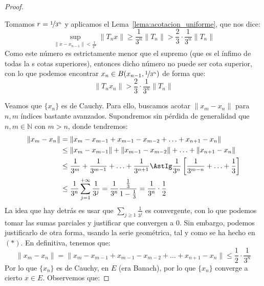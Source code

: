 \begin{teo}
\begin{proof}
\begin{itemize}
                Tomamos $r = \nicefrac{1}{3^n}$ y aplicamos el Lema~\ref{lema:acotacion_uniforme}, que nos dice:
                \begin{equation*}
                    \sup_{\|x-x_{n-1}\| < \frac{1}{3^n}}\|T_nx\| \geq \dfrac{1}{3^n}\|T_n\| > \dfrac{2}{3}\cdot \dfrac{1}{3^n} \|T_n\|
                \end{equation*}
                Como este número es estrictamente menor que el supremo (que es el ínfimo de todas la s cotas superiores), entonces dicho número no puede ser cota superior, con lo que podemos encontrar $x_n \in B(x_{n-1},\nicefrac{1}{3^n})$ de forma que:
                \begin{equation*}
                    \|T_nx_n\| > \dfrac{2}{3}\cdot \dfrac{1}{3^n}\|T_n\|
                \end{equation*}
        \end{itemize}
        Veamos que $\{x_n\}$ es de Cauchy. Para ello, buscamos acotar $\|x_m - x_n\|$ para $n,m$ índices bastante avanzados. Supondremos sin pérdida de generalidad que $n,m\in \mathbb{N}$ con $m>n$, donde tendremos:
        \begin{align*}
            \|x_m-x_n\| &= \|x_m - x_{m-1} + x_{m-1} - x_{m-2} + \ldots + x_{n+1} - x_n\| \\
                        &\leq \|x_m - x_{m-1} \| + \| x_{m-1} - x_{m-2} \| + \ldots + \|x_{n+1} - x_n\| \\
                        &\leq \dfrac{1}{3^m} + \dfrac{1}{3^{m-1}} + \ldots + \dfrac{1}{3^{n+1}} \AstIg \dfrac{1}{3^n}\left[\dfrac{1}{3^{m-n}} + \ldots + \dfrac{1}{3}\right] \\
                        &\leq \dfrac{1}{3^n} \sum_{j=1}^{+\infty} \dfrac{1}{3^j} = \dfrac{1}{3^n} \dfrac{\frac{1}{3}}{1-\frac{1}{3}} = \dfrac{1}{3^n}\cdot \dfrac{1}{2}
        \end{align*}
        La idea que hay detrás es usar que $\sum_{j\geq 1} \frac{1}{3^j}$ es convergente, con lo que podemos tomar las sumas parciales y justificar que convergen a $0$. Sin embargo, podemos justificarlo de otra forma, usando la serie geométrica, tal y como se ha hecho en $(\ast)$. En definitiva, tenemos que:
        \begin{equation*}
            \|x_m-x_n\| = \|x_m - x_{m-1} + x_{m-1} - x_{m-2} + \ldots + x_{n+1} - x_n\| \leq \dfrac{1}{2}\cdot \dfrac{1}{3^n}
        \end{equation*}
        Por lo que $\{x_n\}$ es de Cauchy, en $E$ (era Banach), por lo que $\{x_n\}$ converge a cierto $x\in E$. Observemos que:

\end{proof}
\end{teo}
